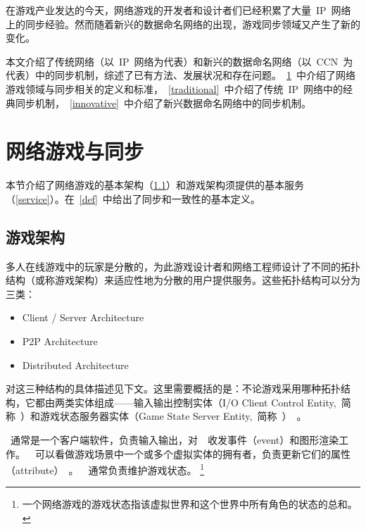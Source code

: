 在游戏产业发达的今天，网络游戏的开发者和设计者们已经积累了大量~IP~网络上的同步经验。然而随着新兴的数据命名网络的出现，游戏同步领域又产生了新的变化。

本文介绍了传统网络（以~IP~网络为代表）和新兴的数据命名网络（以~CCN~为代表）中的同步机制，综述了已有方法、发展状况和存在问题。~\ref{notion}~中介绍了网络游戏领域与同步相关的定义和标准，~\ref{traditional}~中介绍了传统~IP~网络中的经典同步机制，~\ref{innovative}~中介绍了新兴数据命名网络中的同步机制。



\section{网络游戏与同步}
\label{notion}
本节介绍了网络游戏的基本架构（\ref{archi}）和游戏架构须提供的基本服务（\ref{service}）。在~\ref{def}~中给出了同步和一致性的基本定义。


\subsection{游戏架构}
\label{archi}

多人在线游戏中的玩家是分散的，为此游戏设计者和网络工程师设计了不同的拓扑结构（或称游戏架构）来适应性地为分散的用户提供服务。这些拓扑结构可以分为三类：
\begin{itemize}
\item Client {\slash} Server Architecture~\csa
\item P2P Architecture~\pa
\item Distributed Architecture~\da
\end{itemize}

对这三种结构的具体描述见下文。这里需要概括的是：不论游戏采用哪种拓扑结构，它都由两类实体组成——输入输出控制实体（I{\slash}O Client Control Entity,~简称~\ioc）和游戏状态服务器实体（Game State Server Entity,~简称~\gss）~\cite{Ferretti2005}。

\ioc~通常是一个客户端软件，负责输入输出，对~\gss~收发事件（event）和图形渲染工作。~\ioc~可以看做游戏场景中一个或多个虚拟实体的拥有者，负责更新它们的属性（attribute）~\cite{hla}。~\gss~通常负责维护游戏状态。
\renewcommand\baselinestretch{1} %
\footnote{一个网络游戏的游戏状态指该虚拟世界和这个世界中所有角色的状态的总和。}


